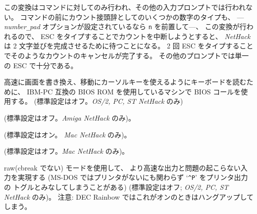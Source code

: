 この変換はコマンドに対してのみ行われ、その他の入力プロンプトでは行われない。
コマンドの前にカウント接頭辞としてのいくつかの数字のタイプも、
---
{\it number\verb+_+pad\/}
オプションが設定されているなら {\tt n} を前置して---、
この変換が行われるので、
ESC をタイプすることでカウントを中断しようとすると、
{\it NetHack\/} は 2 文字並びを完成させるために待つことになる。
2 回 ESC をタイプすることでそのようなカウントのキャンセルが完了する。
その他のプロンプトでは単一の ESC で十分である。
\item[\ib{BIOS}]
高速に画面を書き換え、移動にカーソルキーを使えるようにキーボードを読むために、
IBM-PC 互換の BIOS ROM を使用しているマシンで BIOS コールを使用する。
(標準設定はオフ。{\it OS/2, PC, ST NetHack\/} のみ)
\item[\ib{flush}]
(標準設定はオフ。{\it Amiga NetHack \/} のみ)。
\item[\ib{Macgraphics}]
(標準設定はオン。 {\it Mac NetHack \/} のみ)。
\item[\ib{page\verb+_+wait}]
(標準設定はオフ。{\it Mac NetHack \/} のみ)。
\item[\ib{rawio}]
raw(cbreak でない) モードを使用して、
より高速な出力と問題の起こらない入力を実現する
(MS-DOS ではプリンタがないにも関わらず `{\tt \^{}P}' をプリンタ出力の
トグルとみなしてしまうことがある)
(標準設定はオフ; {\it OS/2, PC, ST NetHack\/} のみ)。
注意: DEC Rainbow ではこれがオンのときはハングアップしてしまう。
